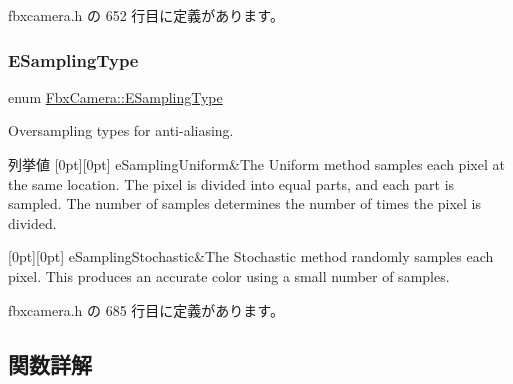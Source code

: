  fbxcamera.\+h の 652 行目に定義があります。

\mbox{\label{class_fbx_camera_aed549486ed0985230efca6fae0d731ae}} 
\subsubsection{\texorpdfstring{E\+Sampling\+Type}{ESamplingType}}
{\footnotesize\ttfamily enum \hyperlink{class_fbx_camera_aed549486ed0985230efca6fae0d731ae}{Fbx\+Camera\+::\+E\+Sampling\+Type}}

Oversampling types for anti-\/aliasing. \begin{DoxyEnumFields}{列挙値}
[0pt][0pt]{}\mbox{\label{class_fbx_camera_aed549486ed0985230efca6fae0d731aea95d0fb02408eda0ecf4d8da0725134a8}} 
e\+Sampling\+Uniform&The Uniform method samples each pixel at the same location. The pixel is divided into equal parts, and each part is sampled. The number of samples determines the number of times the pixel is divided. \\
\hline

[0pt][0pt]{}\mbox{\label{class_fbx_camera_aed549486ed0985230efca6fae0d731aea799fd52a0de2b544194395fa6b8f198a}} 
e\+Sampling\+Stochastic&The Stochastic method randomly samples each pixel. This produces an accurate color using a small number of samples. \\
\hline

\end{DoxyEnumFields}


 fbxcamera.\+h の 685 行目に定義があります。



\subsection{関数詳解}
\mbox{\label{class_fbx_camera_ac4549addd7a3f9dc62843b9208a52d81}} 

